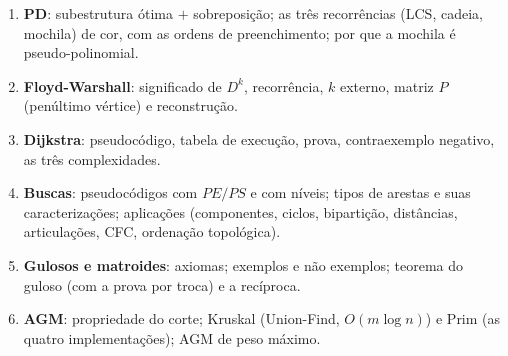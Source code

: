 \begin{chave}
\begin{enumerate}
  \item \textbf{PD}: subestrutura ótima $+$ sobreposição; as três recorrências (LCS, cadeia, mochila) de cor, com as ordens de preenchimento; por que a mochila é pseudo-polinomial.
  \item \textbf{Floyd-Warshall}: significado de $D^k$, recorrência, $k$ externo, matriz $P$ (penúltimo vértice) e reconstrução.
  \item \textbf{Dijkstra}: pseudocódigo, tabela de execução, prova, contraexemplo negativo, as três complexidades.
  \item \textbf{Buscas}: pseudocódigos com $PE/PS$ e com níveis; tipos de arestas e suas caracterizações; aplicações (componentes, ciclos, bipartição, distâncias, articulações, CFC, ordenação topológica).
  \item \textbf{Gulosos e matroides}: axiomas; exemplos e não exemplos; teorema do guloso (com a prova por troca) e a recíproca.
  \item \textbf{AGM}: propriedade do corte; Kruskal (Union-Find, $O(m\log n)$) e Prim (as quatro implementações); AGM de peso máximo.
\end{enumerate}
\end{chave}
